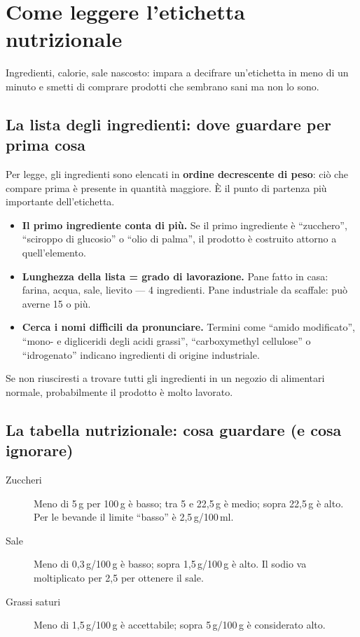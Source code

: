 \documentclass[a5paper,12pt,oneside,openany]{book}
\newcommand{\boxinfo}[2]{%
  \begin{tcolorbox}[boxbase,
    colback=blinfo!8!white, colframe=blinfo, title={#1}]
  #2\end{tcolorbox}}
\begin{document}
\chapter{Come leggere l'etichetta nutrizionale}

Ingredienti, calorie, sale nascosto: impara a decifrare un'etichetta in
meno di un minuto e smetti di comprare prodotti che sembrano sani ma non
lo sono.

\section{La lista degli ingredienti: dove guardare per prima cosa}

Per legge, gli ingredienti sono elencati in \textbf{ordine decrescente di
peso}: ciò che compare prima è presente in quantità maggiore. È il punto
di partenza più importante dell'etichetta.

\begin{itemize}
  \item \textbf{Il primo ingrediente conta di più.} Se il primo
    ingrediente è ``zucchero'', ``sciroppo di glucosio'' o ``olio di palma'',
    il prodotto è costruito attorno a quell'elemento.
  \item \textbf{Lunghezza della lista = grado di lavorazione.} Pane fatto
    in casa: farina, acqua, sale, lievito --- 4 ingredienti. Pane
    industriale da scaffale: può averne 15 o più.
  \item \textbf{Cerca i nomi difficili da pronunciare.} Termini come
    ``amido modificato'', ``mono- e digliceridi degli acidi grassi'',
    ``carboxymethyl cellulose'' o ``idrogenato'' indicano ingredienti di
    origine industriale.
\end{itemize}

\boxinfo{Regola pratica}{Se non riusciresti a trovare tutti gli ingredienti
in un negozio di alimentari normale, probabilmente il prodotto è molto
lavorato.}

\section{La tabella nutrizionale: cosa guardare (e cosa ignorare)}

\begin{description}
  \item[Zuccheri] Meno di 5\,g per 100\,g è basso; tra 5 e 22,5\,g è
    medio; sopra 22,5\,g è alto. Per le bevande il limite ``basso'' è
    2,5\,g/100\,ml.
  \item[Sale] Meno di 0,3\,g/100\,g è basso; sopra 1,5\,g/100\,g è
    alto. Il sodio va moltiplicato per 2,5 per ottenere il sale.
  \item[Grassi saturi] Meno di 1,5\,g/100\,g è accettabile; sopra
    5\,g/100\,g è considerato alto.
\end{description}
\end{document}
